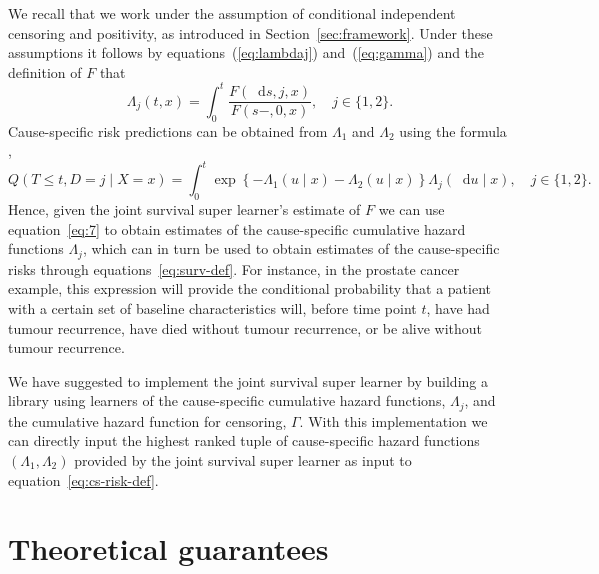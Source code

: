 \documentclass[lineno]{biometrika}
\newcommand*\diff{\mathop{}\!\mathrm{d}}
\newcommand{\1}{\mathds{1}}
\begin{document}
We recall that we work under the assumption of conditional independent
censoring and positivity, as introduced in
Section~\ref{sec:framework}. Under these assumptions it follows by
equations~(\ref{eq:lambdaj}) and~(\ref{eq:gamma}) and the definition
of \( F \) that
\begin{equation}
  \label{eq:7}
  \Lambda_j(t , x) 
  = \int_0^t  \frac{F(\diff s, j, x )}{F(s-, 0, x )},
  \quad j \in \{1,2\}.
\end{equation}
Cause-specific risk predictions can be obtained from \( \Lambda_1 \)
and $\Lambda_2$ using the formula
\citep[e.g.,][]{benichou1990estimates, ozenne2017riskregression},
\begin{equation}
  \label{eq:cs-risk-def}
  Q(T \leq t, D = j \mid X=x) =
  \int_0^t \exp\left\{-\Lambda_{1}(u \mid x)-\Lambda_{2}(u
    \mid x)\right\}  \Lambda_j(\diff u \mid x),
  \quad j \in \{1,2\}.
\end{equation}
Hence, given the joint survival super learner's estimate of \( F \) we
can use equation~\eqref{eq:7} to obtain estimates of the
cause-specific cumulative hazard functions $\Lambda_j$, which can in
turn be used to obtain estimates of the cause-specific risks through
equations~\eqref{eq:surv-def}. For instance, in the prostate cancer
example, this expression will provide the conditional probability that
a patient with a certain set of baseline characteristics will, before
time point \( t \), have had tumour recurrence, have died without tumour
recurrence, or be alive without tumour recurrence.

We have suggested to implement the joint survival super learner by building a library
using learners of the cause-specific cumulative hazard functions,
$\Lambda_j$, and the cumulative hazard function for censoring,
$\Gamma$. With this implementation we can directly input the highest
ranked tuple of cause-specific hazard functions
$(\Lambda_1, \Lambda_2)$ provided by the joint survival super learner as input to
equation~\eqref{eq:cs-risk-def}.

\section{Theoretical guarantees}
\label{sec:theor-results-prop}
\end{document}
